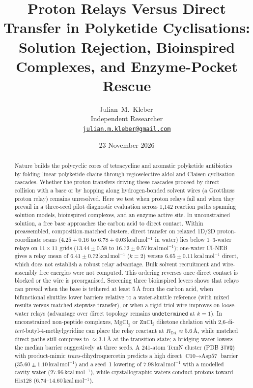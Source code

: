 \documentclass[11pt,a4paper]{article}
\title{\textbf{Proton Relays Versus Direct Transfer in Polyketide Cyclisations: Solution Rejection, Bioinspired Complexes, and Enzyme-Pocket Rescue}}
\author{Julian~M.~Kleber\,\orcidlink{0000-0001-5518-0932}\\[2pt]
\small Independent Researcher\\
\small \href{mailto:julian.m.kleber@gmail.com}{\texttt{julian.m.kleber@gmail.com}}}
\date{23 November 2026}
\begin{document}
\maketitle

\begin{abstract}
Nature builds the polycyclic cores of tetracycline and aromatic polyketide antibiotics by folding linear polyketide chains through regioselective aldol and Claisen cyclisation cascades. Whether the proton transfers driving these cascades proceed by direct collision with a base or by hopping along hydrogen-bonded solvent wires (a Grotthuss proton relay) remains unresolved. Here we test when proton relays fail and when they prevail in a three-seed pilot diagnostic evaluation across 1{,}142 reaction paths spanning solution models, bioinspired complexes, and an enzyme active site. In unconstrained solution, a free base approaches the carbon acid to direct contact. Within preassembled, composition-matched clusters, direct transfer on relaxed 1D/2D proton-coordinate scans ($4.25 \pm 0.16$ to $6.78 \pm 0.03$\,kcal\,mol$^{-1}$ in water) lies below $1$--$3$-water relays on $11\times 11$ grids ($13.44 \pm 0.58$ to $16.72 \pm 0.57$\,kcal\,mol$^{-1}$); one-water CI-NEB gives a relay mean of $6.41 \pm 0.72$\,kcal\,mol$^{-1}$ ($k=2$) versus $6.65 \pm 0.11$\,kcal\,mol$^{-1}$ direct, which does not establish a robust relay advantage. Bulk solvent recruitment and wire-assembly free energies were not computed. This ordering reverses once direct contact is blocked or the wire is preorganised. Screening three bioinspired levers shows that relays can prevail when the base is tethered at least $5$\,\AA{} from the carbon acid, when bifunctional shuttles lower barriers relative to a water-shuttle reference (with mixed results versus matched stepwise transfer), or when a rigid triol wire improves on loose-water relays (advantage over direct topology remains \texttt{undetermined} at $k=1$). In unconstrained non-peptide complexes, $\text{MgCl}_2$ or $\text{ZnCl}_2$ diketone chelation with 2,6-di-\textit{tert}-butyl-4-methylpyridine can place the relay reactant at $R_{\text{DA}} \approx 5.6$\,\AA{}, while matched direct paths still compress to $\approx 3.1$\,\AA{} at the transition state; a bridging water lowers the median barrier suggestively at three seeds. A 241-atom TcmN cluster (PDB \texttt{3TVQ}) with product-mimic \textit{trans}-dihydroquercetin predicts a high direct $\text{C10}\to\text{Asp57}$ barrier ($35.60 \pm 1.10$\,kcal\,mol$^{-1}$) and a seed~1 lowering of $7.98$\,kcal\,mol$^{-1}$ with a modelled cavity water ($27.96$\,kcal\,mol$^{-1}$), while crystallographic waters conduct protons toward $\text{His128}$ ($6.74$--$14.60$\,kcal\,mol$^{-1}$).
\end{abstract}
\end{document}
